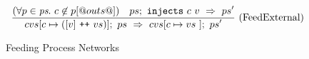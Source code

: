 \begin{figure}
$$
\enskip \frac {\displaystyle 
  (\forall p \in \textit{ps}.~c \not\in p[@outs@])
\quad
  ps;~\texttt{injects}~c~v~\Rightarrow~ps'
} {\displaystyle 
  cvs[c \mapsto ([v] ~\texttt{++}~ vs)];~ps~\Rightarrow~cvs[c \mapsto vs~];~ps'
} \  \mbox{(FeedExternal)} \enskip
$$



\caption{Feeding Process Networks}
\label{fig:Process:Eval:Feed}
\end{figure}

